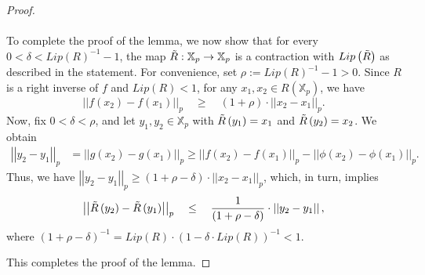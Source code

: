 \documentclass[a4paper, 12pt]{article}
\theoremstyle{definition}
\begin{document}
\begin{proof}
		\paragraph{}
		To complete the proof of the lemma, we now show that for every  $ 0 <  \delta  < Lip \left(  R  \right) ^{-1} -1  $, the map $\Tilde{R}: \mathbb{X}_{p} \to \mathbb{X}_{p}$ is a contraction with $Lip \left(  \Tilde{R}  \right) $ as described in the statement. 
		For convenience, set $ \rho :=     Lip \left(  R  \right) ^{-1} - 1  > 0 $.
		Since $R$ is a right inverse of $f$ and  $ Lip \left(  R  \right)   < 1$, for any  $x_{1}, x_{2} \in R \left(  \mathbb{X}_{p}  \right) $, we have   
		$$ \left| \left|  f \left(  x_{2}  \right)  - f \left(  x_{1}  \right)   \right|  \right|_{p} \quad \ge \quad  (1 + \rho) \cdot  \left| \left|  x_{2} - x_{1}  \right|  \right|_{p} . $$
		Now, fix $ 0  < \delta  < \rho$, and let $y_{1}, y_{2} \in \mathbb{X}_{p}$ with $\Tilde{R} \left(  y_{1}  \right)  = x_{1}$ and $\Tilde{R} \left(  y_{2}  \right)  = x_{2}$.  
		We obtain 
		\begin{align*}
			\left| \left|  y_{2} - y_{1}  \right|  \right|_{p}   &=     \left| \left|  g \left(  x_{2}  \right)  - g \left(  x_{1}  \right)   \right|  \right|_{p}   \ge     \left| \left|  f \left(  x_{2}  \right)  - f \left(  x_{1}  \right)   \right|  \right|_{p} -  \left| \left|  \phi \left(  x_{2}  \right)   - \phi \left(  x_{1}  \right)   \right|  \right|_{p}  .
		\end{align*}
		Thus, we have $ \left| \left|  y_{2} - y_{1}  \right|  \right|_{p} \ge (1 + \rho -\delta)\cdot  \left| \left|  x_{2} - x_{1}  \right|  \right|_{p} $, which, in turn, implies 
		$$  \left| \left|  \Tilde{R} \left(  y_{2}  \right)  - \Tilde{R} \left(  y_{1}  \right)   \right|  \right|_{p} \quad \le \quad  {1 \over (1 + \rho - \delta)} \cdot  \left| \left|  y_{2} - y_{1}  \right| \right| , $$
		where $  \left(   1 + \rho - \delta  \right) ^{-1} =   Lip \left(  R  \right)  \cdot  \left(  1 - \delta \cdot Lip \left(  R  \right)   \right) ^{-1}   <   1  $.
		
		This completes the proof of the lemma. 
		
		
	\end{proof}
	
	
	
	
	
	
	\paragraph{}
	
\end{document}
